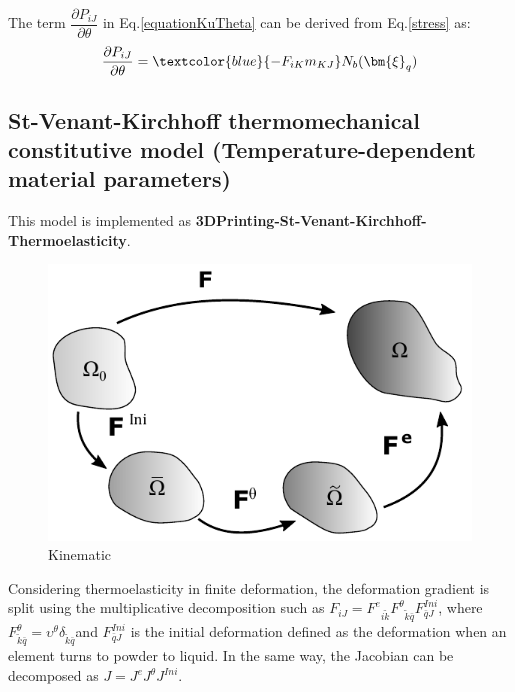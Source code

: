 \documentclass[oneside,11pt,times]{book}
\begin{document}
The term $\dfrac{\partial P_{iJ}}{ \partial{\theta}}$ in Eq.\eqref{equationKuTheta} can be derived from Eq.\eqref{stress} as:
\begin{equation}
\begin{aligned}
\centering
\dfrac{\partial P_{iJ}}{ \partial{\theta}}=\textcolor{blue}{-F_{iK}m_{KJ}}N_b(\bm{\xi}_q)
\end{aligned}
\label{equationdPhiTimedPhi}
\end{equation}

\subsection{St-Venant-Kirchhoff thermomechanical constitutive model (Temperature-dependent material parameters)}\label{3Dprinting-model}

This model is implemented as \textbf{3DPrinting-St-Venant-Kirchhoff-Thermoelasticity}.
\begin{figure}[htp]
    \centering
    \includegraphics[scale=1]{imgs/UserManual/Kinematic.pdf}
    \caption{Kinematic}
    \label{fig:Kinematic}
\end{figure}

Considering thermoelasticity in finite deformation, the deformation gradient is split using the multiplicative decomposition such as $F_{iJ}={F^e}_{i\tilde{k}}{F^{\theta}}_{\tilde{k}\bar{q}}F^{Ini}_{\bar{q}J}$, where ${F}^{\theta}_{\tilde{k}\bar{q}}=\upsilon^{\theta}\delta_{\tilde{k}\bar{q}}$and $F^{Ini}_{\bar{q}J}$ is the initial deformation defined as the deformation when an element turns to powder to liquid. In the same way, the Jacobian can be decomposed as $J=J^e J^{\theta}J^{Ini}$.\\
\end{document}
